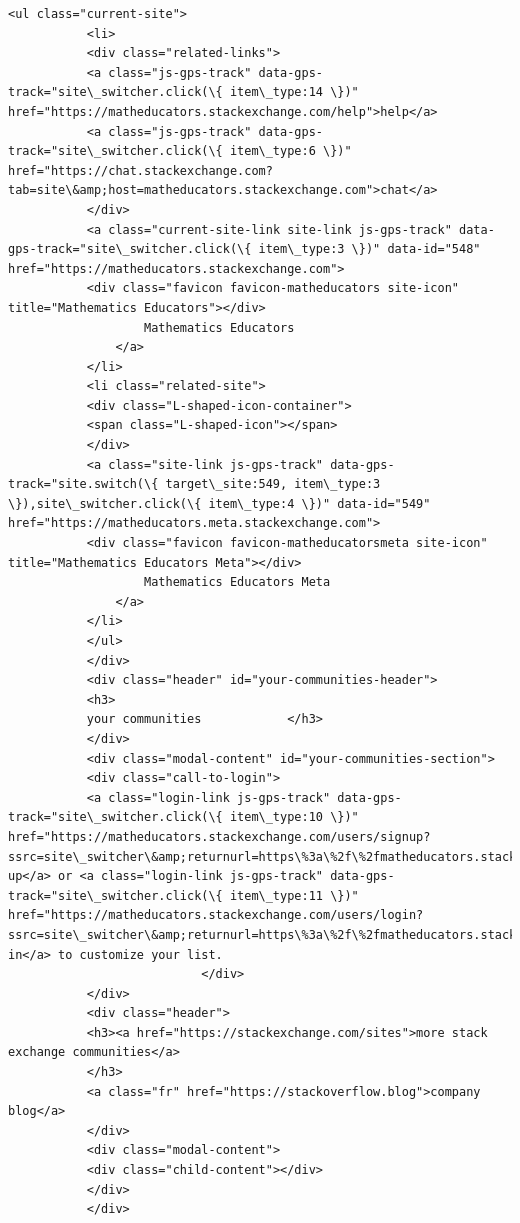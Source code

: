 \documentclass[11pt]{article}
\begin{document}
\begin{Verbatim}[commandchars=\\\{\}]
           <ul class="current-site">
           <li>
           <div class="related-links">
           <a class="js-gps-track" data-gps-track="site\_switcher.click(\{ item\_type:14 \})" href="https://matheducators.stackexchange.com/help">help</a>
           <a class="js-gps-track" data-gps-track="site\_switcher.click(\{ item\_type:6 \})" href="https://chat.stackexchange.com?tab=site\&amp;host=matheducators.stackexchange.com">chat</a>
           </div>
           <a class="current-site-link site-link js-gps-track" data-gps-track="site\_switcher.click(\{ item\_type:3 \})" data-id="548" href="https://matheducators.stackexchange.com">
           <div class="favicon favicon-matheducators site-icon" title="Mathematics Educators"></div>
                   Mathematics Educators
               </a>
           </li>
           <li class="related-site">
           <div class="L-shaped-icon-container">
           <span class="L-shaped-icon"></span>
           </div>
           <a class="site-link js-gps-track" data-gps-track="site.switch(\{ target\_site:549, item\_type:3 \}),site\_switcher.click(\{ item\_type:4 \})" data-id="549" href="https://matheducators.meta.stackexchange.com">
           <div class="favicon favicon-matheducatorsmeta site-icon" title="Mathematics Educators Meta"></div>
                   Mathematics Educators Meta
               </a>
           </li>
           </ul>
           </div>
           <div class="header" id="your-communities-header">
           <h3>
           your communities            </h3>
           </div>
           <div class="modal-content" id="your-communities-section">
           <div class="call-to-login">
           <a class="login-link js-gps-track" data-gps-track="site\_switcher.click(\{ item\_type:10 \})" href="https://matheducators.stackexchange.com/users/signup?ssrc=site\_switcher\&amp;returnurl=https\%3a\%2f\%2fmatheducators.stackexchange.com\%2f">Sign up</a> or <a class="login-link js-gps-track" data-gps-track="site\_switcher.click(\{ item\_type:11 \})" href="https://matheducators.stackexchange.com/users/login?ssrc=site\_switcher\&amp;returnurl=https\%3a\%2f\%2fmatheducators.stackexchange.com\%2f">log in</a> to customize your list.
                           </div>
           </div>
           <div class="header">
           <h3><a href="https://stackexchange.com/sites">more stack exchange communities</a>
           </h3>
           <a class="fr" href="https://stackoverflow.blog">company blog</a>
           </div>
           <div class="modal-content">
           <div class="child-content"></div>
           </div>
           </div>

\end{Verbatim}
\end{document}

